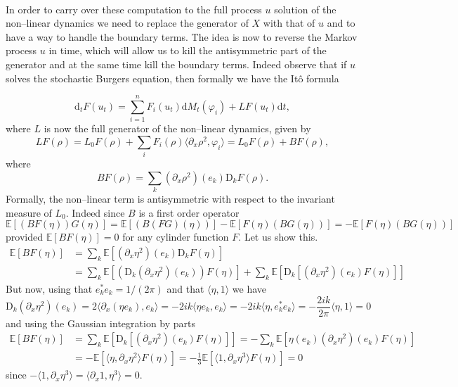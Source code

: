 \documentclass[a4paper,11pt]{article}
\newcommand{\mathD}{\mathrm{D}}
\newcommand{\mathd}{\mathrm{d}}
\begin{document}
\

In order to carry over these computation to the full process $u$ solution of
the non--linear dynamics we need to replace the generator of $X$ with that of
$u$ and to have a way to handle the boundary terms. The idea is now to reverse
the Markov process $u$ in time, which will allow us to kill the antisymmetric
part of the generator and at the same time kill the boundary terms. Indeed
observe that if $u$ solves the stochastic Burgers equation, then formally we
have the It{\^o} formula


\[ \mathd_t F (u_t) = \sum_{i = 1}^n F_i (u_t) \mathd M_t (\varphi_i) + L F
   (u_t) \mathd t, \]
where $L$ is now the full generator of the non--linear dynamics, given by
\[ L F (\rho) = L_0 F (\rho) + \sum_i F_i (\rho) \langle \partial_x \rho^2,
   \varphi_i \rangle = L_0 F (\rho) + B F (\rho), \]
where
\[ B F (\rho) = \sum_k (\partial_x \rho^2) (e_k) \mathD_k F (\rho) . \]
Formally, the non--linear term is antisymmetric with respect to the
invariant measure of $L_0$. Indeed since $B$ is a first order operator
\begin{equation}
\label{eq:antisymmetry of nonlinear} 
\mathbb{E} [(B F (\eta)) G (\eta)] =\mathbb{E} [(B (F G) (\eta))]
   -\mathbb{E} [F (\eta) (B G (\eta))] =  -\mathbb{E} [F (\eta) (B G (\eta))]
\end{equation}
provided $\mathbb{E} [B F (\eta)]=0$ for any cylinder function $F$. Let us show this. 
\begin{equation*}
\begin{aligned}
\mathbb{E} [B F (\eta)] & = \sum_k \mathbb{E} [(\partial_x \eta^2) (e_k)
   \mathD_k F (\eta)]\\
   &  = \sum_k \mathbb{E} [(\mathD_k (\partial_x \eta^2) (e_k)) F (\eta)] +
   \sum_k \mathbb{E} [\mathD_k [(\partial_x \eta^2) (e_k) F (\eta)]]
\end{aligned}
\end{equation*}
But now, using that $e_k^{\ast} e_k = 1 / (2 \pi)$ and that $\langle \eta, 1
\rangle$ we have
\begin{equation*}
\mathD_k (\partial_x \eta^2) (e_k) = 2 \langle \partial_x (\eta e_k), e_k
   \rangle = - 2 i k \langle \eta e_k, e_k \rangle = - 2 i k \langle \eta,
   e_k^{\ast} e_k \rangle = - \frac{2 ik}{2 \pi} \langle \eta, 1 \rangle = 0
\end{equation*}
and using the Gaussian integration by parts
\begin{equation*}
\begin{aligned}
\mathbb{E} [B F (\eta)] &= \sum_k \mathbb{E} [\mathD_k [(\partial_x
   \eta^2) (e_k) F (\eta)]] = - \sum_k \mathbb{E} [\eta (e_k) (\partial_x
   \eta^2) (e_k) F (\eta)] \\
   & = -\mathbb{E} [\langle \eta, \partial_x \eta^2 \rangle F (\eta)] = -
   \frac{1}{3} \mathbb{E} [\langle 1, \partial_x \eta^3 \rangle F (\eta)] = 0
\end{aligned}
\end{equation*}
since $- \langle 1, \partial_x \eta^3 \rangle = \langle \partial_x 1, \eta^3
\rangle = 0$.
\end{document}
